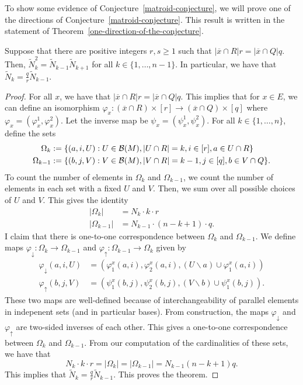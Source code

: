 \documentclass{puthesis-UG}
\begin{document}
To show some evidence of Conjecture~\ref{matroid-conjecture}, we will prove one of the directions of Conjecture~\ref{matroid-conjecture}. This result is written in the statement of Theorem~\ref{one-direction-of-the-conjecture}.

\begin{thm} \label{one-direction-of-the-conjecture}
	Suppose that there are positive integers $r, s \geq 1$ such that $| \overline{x} \cap R| r = |\overline{x} \cap Q| q$. Then, $\widetilde{N}_k^2 = \widetilde{N}_{k-1} \widetilde{N}_{k+1}$ for all $k \in \{1, \ldots, n-1\}$. In particular, we have that $\widetilde{N}_k = \frac{q}{r} \widetilde{N}_{k-1}$. 
\end{thm}

\begin{proof}
	For all $x$, we have that $| \overline{x} \cap R| r = |\overline{x} \cap Q| q$. This implies that for $x \in E$, we can define an isomorphism $\varphi_x : (\overline{x} \cap R) \times [r] \to (\overline{x} \cap Q) \times [q]$ where $\varphi_x = \left(\varphi_x^1, \varphi_x^2\right)$. Let the inverse map be $\psi_x = (\psi_x^1, \psi_x^2)$. For all $k \in \{1, \ldots, n\}$, define the sets
	\begin{align*}
		\Omega_k & := \{(a, i, U) : U \in \mathcal{B}(M), |U \cap R| = k, i \in [r], a \in U \cap R\} \\
		\Omega_{k-1} & := \{(b, j, V) : V \in \mathcal{B}(M), |V \cap R| = k-1, j \in [q], b \in V \cap Q\}.
	\end{align*}
	To count the number of elements in $\Omega_k$ and $\Omega_{k-1}$, we count the number of elements in each set with a fixed $U$ and $V$. Then, we sum over all possible choices of $U$ and $V$. This gives the identity
	\begin{align*}
		|\Omega_k| & = N_k \cdot k \cdot r \\
		|\Omega_{k-1}| & = N_{k-1} \cdot (n-k+1) \cdot q.
	\end{align*}
	I claim that there is one-to-one correspondence between $\Omega_k$ and $\Omega_{k-1}$. We define maps $\varphi_{\downarrow} : \Omega_k \to \Omega_{k-1}$ and $\varphi_{\uparrow} : \Omega_{k-1} \to \Omega_k$ given by 
	\begin{align*}
		\varphi_{\downarrow}(a, i, U) & = (\varphi_1^x(a, i), \varphi_2^x (a, i) , (U \backslash a) \cup \varphi_1^x (a, i)) \\
		\varphi_{\uparrow} (b, j, V) & = (\psi_1^x(b, j), \psi_2^x(b,j), (V \backslash b) \cup \psi_1^x(b, j)).
	\end{align*}
	These two maps are well-defined because of interchangeability of parallel elements in indepenent sets (and in particular bases). From construction, the maps $\varphi_{\downarrow}$ and $\varphi_{\uparrow}$ are two-sided inverses of each other. This gives a one-to-one correspondence between $\Omega_k$ and $\Omega_{k-1}$. From our computation of the cardinalities of these sets, we have that 
	\[
		N_k \cdot k \cdot r = |\Omega_k| = |\Omega_{k-1}| = N_{k-1} (n-k+1) q.
	\]
	This implies that $\widetilde{N}_k = \frac{q}{r} \widetilde{N}_{k-1}$. This proves the theorem. 
\end{proof}
\end{document}
